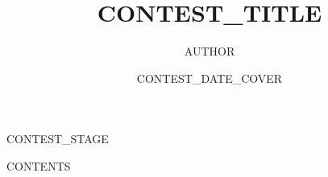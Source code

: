 \documentclass[UTF8,fontset=none,zihao=-4]{ctexart}
\title{ {{CONTEST_TITLE}} }
\author{ {{AUTHOR}} }
\date{ {{CONTEST_DATE_COVER}} }
\begin{document}
\maketitle
\begin{center}{{CONTEST_STAGE}}\end{center}
\tableofcontents
{{CONTENTS}}
\end{document}

